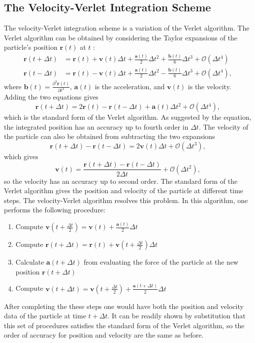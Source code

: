 \documentclass[12pt]{article}
\newcommand{\inc}{\Delta}
\renewcommand{\O}[1]{\mathcal{O}(#1)}
\begin{document}
\subsection{The Velocity-Verlet Integration Scheme}
\label{app:velocity-verlet}
The velocity-Verlet integration scheme is a variation of the Verlet algorithm. The Verlet algorithm can be obtained by considering the Taylor expansions of the particle's position $\bm{r}(t)$ at $t$ :
\begin{align}
\bm{r}(t + \inc t) & = \bm{r}(t) + \bm{v}(t) \inc t + \frac{\bm{a}(t) }{2}\inc t^2 + \frac{\bm{b}(t) }{6}\inc t^3 + \O{\inc t^4}\\
\bm{r}(t - \inc t) & =  \bm{r}(t) - \bm{v}(t) \inc t  + \frac{\bm{a}(t)}{2} \inc t^2 - \frac{\bm{b}(t) }{6}\inc t^3 + \O{\inc t^4},
\end{align}
where $\bm{b}(t) = \frac{\partial^3\bm{r}(t)}{\partial t^3}$, $\bm{a}(t)$ is the acceleration, and $\bm{v}(t)$ is the velocity. Adding the two equations gives
\begin{equation}
\bm{r}(t+\inc t)  = 2\bm{r}(t) - \bm{r}(t-\inc t) + \bm{a}(t)\inc t^2 + \O{\inc t^4},
\end{equation}
which is the standard form of the Verlet algorithm. As suggested by the equation, the integrated position has an accuracy up to fourth order in $\inc t$. The velocity of the particle can also be obtained from subtracting the two expansions
\begin{equation}
\bm{r}(t+\inc t) - \bm{r}(t - \inc t) = 2\bm{v}(t)\inc t + \O{\inc t^3},
\end{equation}
which gives
\begin{equation}
\bm{v}(t) = \frac{\bm{r}(t+\inc t) - \bm{r}(t - \inc t)}{2\inc t} + \O{\inc t^2},
\end{equation}
so the velocity has an accuracy up to second order. The standard form of the Verlet algorithm gives the position and velocity of the particle at different time steps. The velocity-Verlet algorithm resolves this problem. In this algorithm, one performs the following procedure:
\begin{enumerate}
\item Compute $\bm{v}\left(t + \frac{\inc t}{2}\right) = \bm{v}(t) + \frac{\bm{a}(t)}{2} \inc t$
\item Compute $\bm{r}(t + \inc t) = \bm{r}(t) + \bm{v}\left(t + \frac{\inc t}{2}\right)\inc t$
\item Calculate $\bm{a}(t + \inc t)$ from evaluating the force of the particle at the new position $\bm{r}(t + \inc t)$
\item Compute $\bm{v}\left(t + \inc t\right) = \bm{v}\left(t + \frac{\inc t}{2}\right) + \frac{\bm{a}(t + \inc t)}{2} \inc t$
\end{enumerate}
After completing the these steps one would have both the position and velocity data of the particle at time $t + \inc t $. It can be readily shown by substitution that this set of procedures satisfies the standard form of the Verlet algorithm, so the order of accuracy for position and velocity are the same as before.  
\end{document}
